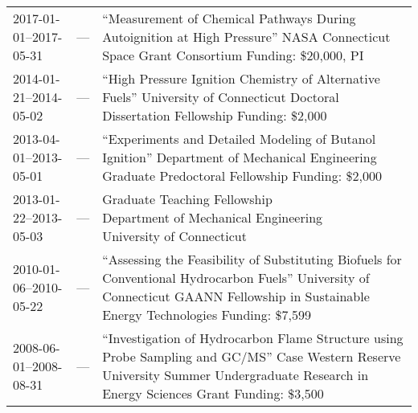 \begin{center}
\begin{longtable}{lcl}
        2017-01-01--2017-05-31 & --- & \makecell{``Measurement of Chemical Pathways During            \\Autoignition at High Pressure'' \\ NASA Connecticut Space Grant Consortium \\ Funding: \$20,000, PI} \\
        2014-01-21--2014-05-02 & --- & \makecell{``High Pressure Ignition Chemistry of Alternative    \\Fuels'' \\University of Connecticut Doctoral Dissertation\\Fellowship \\Funding: \$2,000}\\
        2013-04-01--2013-05-01 & --- & \makecell{``Experiments and Detailed Modeling of Butanol       \\Ignition'' \\Department of Mechanical Engineering Graduate \\Predoctoral Fellowship \\Funding: \$2,000}\\
        2013-01-22--2013-05-03 & --- & \makecell{Graduate Teaching Fellowship                         \\Department of Mechanical Engineering \\University of Connecticut} \\
        2010-01-06--2010-05-22 & --- & \makecell{``Assessing the Feasibility of Substituting Biofuels \\for Conventional Hydrocarbon Fuels'' \\University of Connecticut GAANN Fellowship \\in Sustainable Energy Technologies \\Funding: \$7,599}\\
        2008-06-01--2008-08-31 & --- & \makecell{``Investigation of Hydrocarbon Flame Structure       \\using Probe Sampling and GC/MS'' \\Case Western Reserve University Summer \\Undergraduate Research in Energy Sciences Grant \\Funding: \$3,500}
    \end{longtable}
\end{center}

